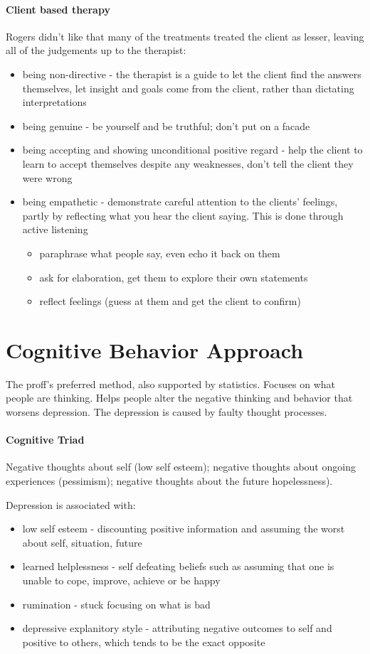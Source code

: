 \documentclass[12pt]{article}
\begin{document}
\paragraph*{Client based therapy} Rogers didn't like that many of the treatments treated the client as lesser, leaving all of the judgements up to the therapist:
\begin{itemize}
\item being non-directive - the therapist is a guide to let the client find the answers themselves, let insight and goals come from the client, rather than dictating interpretations
\item being genuine - be yourself and be truthful; don't put on a facade
\item being accepting and showing unconditional positive regard - help the client to learn to accept themselves despite any weaknesses, don't tell the client they were wrong
\item being empathetic - demonstrate careful attention to the clients' feelings, partly by reflecting what you hear the client saying. This is done through active listening
\begin{itemize}
\item paraphrase what people say, even echo it back on them
\item ask for elaboration, get them to explore their own statements
\item reflect feelings (guess at them and get the client to confirm)
\end{itemize}
\end{itemize}
\section*{Cognitive Behavior Approach}
The proff's preferred method, also supported by statistics. Focuses on what people are thinking. Helps people alter the negative thinking and behavior that worsens depression. The depression is caused by faulty thought processes. 
\paragraph*{Cognitive Triad} Negative thoughts about self (low self esteem); negative thoughts about ongoing experiences (pessimism); negative thoughts about the future hopelessness).

Depression is associated with:
\begin{itemize}
\item low self esteem - discounting positive information and assuming the worst about self, situation, future
\item learned helplessness - self defeating beliefs such as assuming that one is unable to cope, improve, achieve or be happy
\item rumination - stuck focusing on what is bad
\item depressive explanitory style  - attributing negative outcomes to self and positive to others, which tends to be the exact opposite
\end{itemize}
\end{document}
